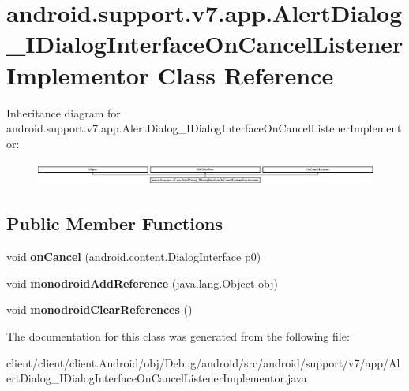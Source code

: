 \hypertarget{classandroid_1_1support_1_1v7_1_1app_1_1AlertDialog__IDialogInterfaceOnCancelListenerImplementor}{}\section{android.\+support.\+v7.\+app.\+Alert\+Dialog\+\_\+\+I\+Dialog\+Interface\+On\+Cancel\+Listener\+Implementor Class Reference}
\label{classandroid_1_1support_1_1v7_1_1app_1_1AlertDialog__IDialogInterfaceOnCancelListenerImplementor}
Inheritance diagram for android.\+support.\+v7.\+app.\+Alert\+Dialog\+\_\+\+I\+Dialog\+Interface\+On\+Cancel\+Listener\+Implementor\+:\begin{figure}[H]
\begin{center}
\leavevmode
\includegraphics[height=0.771350cm]{classandroid_1_1support_1_1v7_1_1app_1_1AlertDialog__IDialogInterfaceOnCancelListenerImplementor}
\end{center}
\end{figure}
\subsection*{Public Member Functions}
\begin{DoxyCompactItemize}
\item 
\hypertarget{classandroid_1_1support_1_1v7_1_1app_1_1AlertDialog__IDialogInterfaceOnCancelListenerImplementor_ae2ec072b3df6d4e38f2537cf8b7a4978}{}void {\bfseries on\+Cancel} (android.\+content.\+Dialog\+Interface p0)\label{classandroid_1_1support_1_1v7_1_1app_1_1AlertDialog__IDialogInterfaceOnCancelListenerImplementor_ae2ec072b3df6d4e38f2537cf8b7a4978}

\item 
\hypertarget{classandroid_1_1support_1_1v7_1_1app_1_1AlertDialog__IDialogInterfaceOnCancelListenerImplementor_a3d21bf61ee97426dcae3644ed4fe5be4}{}void {\bfseries monodroid\+Add\+Reference} (java.\+lang.\+Object obj)\label{classandroid_1_1support_1_1v7_1_1app_1_1AlertDialog__IDialogInterfaceOnCancelListenerImplementor_a3d21bf61ee97426dcae3644ed4fe5be4}

\item 
\hypertarget{classandroid_1_1support_1_1v7_1_1app_1_1AlertDialog__IDialogInterfaceOnCancelListenerImplementor_a090abc2cc0327da238bc171c57f28c56}{}void {\bfseries monodroid\+Clear\+References} ()\label{classandroid_1_1support_1_1v7_1_1app_1_1AlertDialog__IDialogInterfaceOnCancelListenerImplementor_a090abc2cc0327da238bc171c57f28c56}

\end{DoxyCompactItemize}


The documentation for this class was generated from the following file\+:\begin{DoxyCompactItemize}
\item 
client/client/client.\+Android/obj/\+Debug/android/src/android/support/v7/app/Alert\+Dialog\+\_\+\+I\+Dialog\+Interface\+On\+Cancel\+Listener\+Implementor.\+java\end{DoxyCompactItemize}
